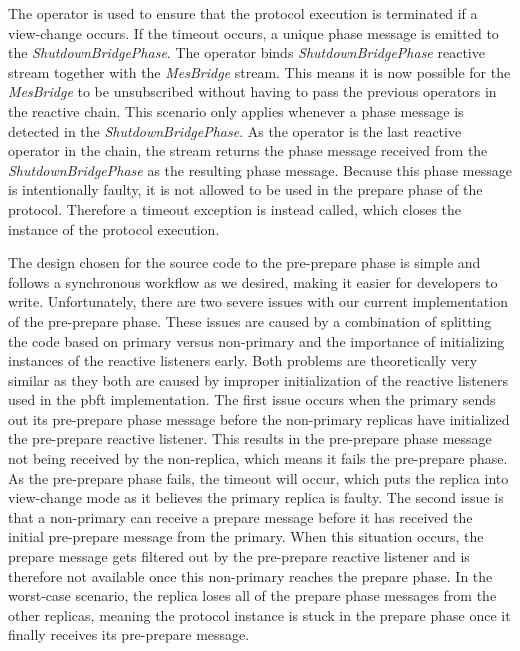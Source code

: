 The  operator is used to ensure that the protocol execution is terminated if a view-change occurs. If the timeout occurs, a unique phase message is emitted to the  \emph{ShutdownBridgePhase}. The  operator binds \emph{ShutdownBridgePhase} reactive stream together with the \emph{MesBridge} stream. This means it is now possible for the \emph{MesBridge} to be unsubscribed without having to pass the previous operators in the reactive chain. This scenario only applies whenever a phase message is detected in the \emph{ShutdownBridgePhase}. As the  operator is the last reactive operator in the chain, the stream returns the phase message received from the \emph{ShutdownBridgePhase} as the resulting phase message. Because this phase message is intentionally faulty, it is not allowed to be used in the prepare phase of the protocol. Therefore a timeout exception is instead called, which closes the instance of the protocol execution.

The design chosen for the source code to the pre-prepare phase is simple and follows a synchronous workflow as we desired, making it easier for developers to write. Unfortunately, there are two severe issues with our current implementation of the pre-prepare phase. These issues are caused by a combination of splitting the code based on primary versus non-primary and the importance of initializing instances of the reactive listeners early. Both problems are theoretically very similar as they both are caused by improper initialization of the reactive listeners used in the \ac{pbft} implementation. The first issue occurs when the primary sends out its pre-prepare phase message before the non-primary replicas have initialized the pre-prepare reactive listener. This results in the pre-prepare phase message not being received by the non-replica, which means it fails the pre-prepare phase. As the pre-prepare phase fails, the timeout will occur, which puts the replica into view-change mode as it believes the primary replica is faulty. The second issue is that a non-primary can receive a prepare message before it has received the initial pre-prepare message from the primary. When this situation occurs, the prepare message gets filtered out by the pre-prepare reactive listener and is therefore not available once this non-primary reaches the prepare phase. In the worst-case scenario, the replica loses all of the prepare phase messages from the other replicas, meaning the protocol instance is stuck in the prepare phase once it finally receives its pre-prepare message.

